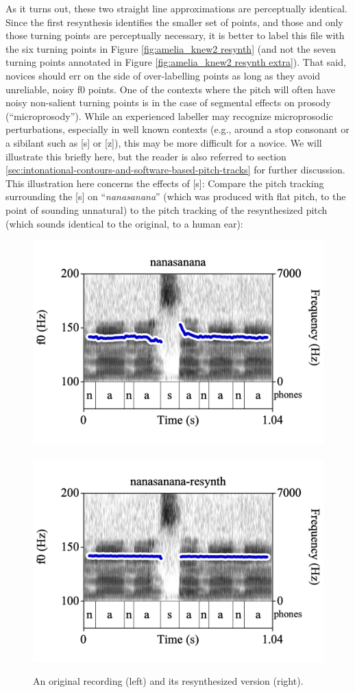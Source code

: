 \documentclass[11pt, twoside]{memoir}
\def\langtext#1{\textit{#1}}
\begin{document}
As it turns out, these two straight line approximations are perceptually identical. Since the first resynthesis identifies the smaller set of points, and those and only those turning points are perceptually necessary, it is better to label this file with the six turning points in Figure \ref{fig:amelia_knew2 resynth} (and not the seven turning points annotated in Figure \ref{fig:amelia_knew2 resynth extra}). That said, novices should err on the side of over-labelling points as long as they avoid unreliable, noisy f0 points.
One of the contexts where the pitch will often have noisy non-salient turning points is in the case of segmental effects on prosody (“microprosody”). While an experienced labeller may recognize microprosodic perturbations, especially in well known contexts (e.g., around a stop consonant or a sibilant such as [s] or [z]), this may be more difficult for a novice. We will illustrate this briefly here, but the reader is also referred to section \ref{sec:intonational-contours-and-software-based-pitch-tracks} for further discussion. This illustration here concerns the effects of [s]: Compare the pitch tracking surrounding the [s] on “\langtext{nanasanana}” (which was produced with flat pitch, to the point of sounding unnatural) to the pitch tracking of the resynthesized pitch (which sounds identical to the original, to a human ear):
\begin{figure}[H]
\centering
\includegraphics[width=.485\linewidth]{Points-nanasanana.png}~~\includegraphics[width=.485\linewidth]{Points-nanasanana-resynth.png}
\caption{An original recording (left) and its resynthesized version (right).
\label{fig:original and resynth}
}
\end{figure}
\end{document}
